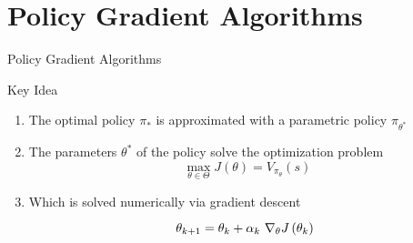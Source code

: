 \section{Policy Gradient Algorithms}


\begin{frame}{Policy Gradient Algorithms}
	
	\begin{block}{Key Idea}
	\begin{enumerate}
		\item<+-> The optimal policy $\pi_*$ is approximated with a parametric policy $\pi_{\theta^*}$
		\item<+-> The parameters $\theta^*$ of the policy solve the optimization problem 
		\begin{equation*}
			\max_{\theta \in \Theta} J(\theta) = V_{\pi_\theta}(s)
		\end{equation*}
		\item<+-> Which is solved numerically via gradient descent
		\begin{equation*}
		\theta_{k+1} = \theta_k + \alpha_k 
       		\tikz[baseline]{
           		\node[anchor=base] (gradient) {$\nabla_\theta J\left(\theta_k\right)$};
       	   }
		\end{equation*}
	\end{enumerate}
	\end{block}
	
\end{frame}

